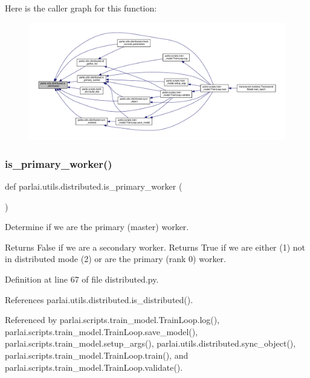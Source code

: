 Here is the caller graph for this function\+:
\nopagebreak
\begin{figure}[H]
\begin{center}
\leavevmode
\includegraphics[width=350pt]{namespaceparlai_1_1utils_1_1distributed_a023acb5e3b66e1f27e21247c35661279_icgraph}
\end{center}
\end{figure}
\mbox{\label{namespaceparlai_1_1utils_1_1distributed_a9bb1dac198180590ef8c6b6c6f9fc2c4}} 
\subsubsection{\texorpdfstring{is\+\_\+primary\+\_\+worker()}{is\_primary\_worker()}}
{\footnotesize\ttfamily def parlai.\+utils.\+distributed.\+is\+\_\+primary\+\_\+worker (\begin{DoxyParamCaption}{ }\end{DoxyParamCaption})}

\begin{DoxyVerb}Determine if we are the primary (master) worker.

Returns False if we are a secondary worker. Returns True if we are either
(1) not in distributed mode (2) or are the primary (rank 0) worker.
\end{DoxyVerb}
 

Definition at line 67 of file distributed.\+py.



References parlai.\+utils.\+distributed.\+is\+\_\+distributed().



Referenced by parlai.\+scripts.\+train\+\_\+model.\+Train\+Loop.\+log(), parlai.\+scripts.\+train\+\_\+model.\+Train\+Loop.\+save\+\_\+model(), parlai.\+scripts.\+train\+\_\+model.\+setup\+\_\+args(), parlai.\+utils.\+distributed.\+sync\+\_\+object(), parlai.\+scripts.\+train\+\_\+model.\+Train\+Loop.\+train(), and parlai.\+scripts.\+train\+\_\+model.\+Train\+Loop.\+validate().

